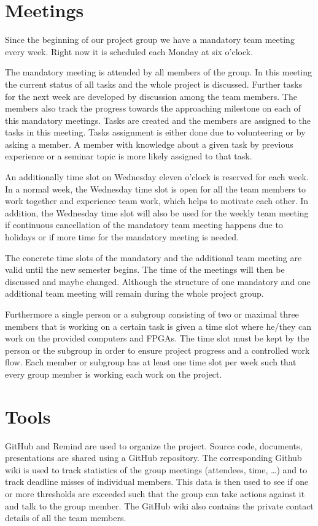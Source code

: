 \section{Meetings}
Since the beginning of our project group we have a mandatory team meeting every week.
Right now it is scheduled each Monday at six o'clock.

The mandatory meeting is attended by all members of the group.
In this meeting the current status of all tasks and the whole project is discussed.
Further tasks for the next week are developed by discussion among the team members.
The members also track the progress towards the approaching milestone on each of this mandatory meetings.
Tasks are created and the members are assigned to the tasks in this meeting. Tasks assignment is either done due to volunteering or by asking a member.
A member with knowledge about a given task by previous experience or a seminar topic is  more likely assigned to that task.

An additionally time slot on Wednesday eleven o'clock is reserved for each week.
In a normal week, the Wednesday time slot is open for all the team members to work together and experience team work, which helps to motivate each other.
In addition, the Wednesday time slot will also be used for the weekly team meeting if continuous cancellation of the mandatory team meeting happens due to holidays
or if more time for the mandatory meeting is needed.

The concrete time slots of the mandatory and the additional team meeting are valid until the new semester begins. The time of the meetings will then be discussed and maybe changed. Although the structure of one mandatory and one additional team meeting will remain during the whole project group.

Furthermore a single person or a subgroup consisting of two or maximal three members that is working on a certain task is given a time slot where he/they can work on the provided computers and \ac{FPGA}s.
The time slot must be kept by the person or the subgroup in order to ensure project progress and a controlled work flow.
Each member or subgroup has at least one time slot per week such that every group member is working each work on the project.

\section{Tools}

GitHub and Remind are used to organize the project.
Source code, documents, presentations are shared using a GitHub repository.
The corresponding Github wiki is used to track statistics of the group meetings (attendees, time, \dots) and to track deadline misses of individual members.
This data is then used to see if one or more thresholds are exceeded such that the group can take actions against it and talk to the group member.
The GitHub wiki also contains the private contact details of all the team members.

